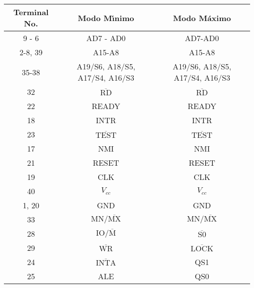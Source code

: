 \begin{table}[!htb]
\centering
\begin{tabular}{|c|c|c|} \hline
Terminal No. & Modo M\'{\i}nimo & Modo M\'aximo \\ \hline

9 - 6 & AD7 - AD0 & AD7-AD0 \\ \hline

2-8, 39 & A15-A8 & A15-A8 \\ \hline

35-38 & \parbox{3cm}{\vspace{3pt}A19/S6, A18/S5, A17/S4, A16/S3\vspace{3pt}} & %
\parbox{3cm}{\vspace{3pt}A19/S6, A18/S5, A17/S4, A16/S3\vspace{3pt}} \\ \hline

32 & $\overline{\mbox{RD}}$ & $\overline{\mbox{RD}}$ \\ \hline

22 & READY & READY \\ \hline

18 & INTR & INTR \\ \hline

23 & $\overline{\mbox{TEST}}$ & $\overline{\mbox{TEST}}$ \\ \hline

17 & NMI & NMI \\ \hline

21 & RESET & RESET \\ \hline

19 & CLK & CLK \\ \hline

40 & $V_{cc}$ & $V_{cc}$ \\ \hline

1, 20 & GND & GND \\ \hline

33 & $\mbox{MN}/\overline{\mbox{MX}}$ & $\mbox{MN}/\overline{\mbox{MX}}$ \\ %
\hline

28 & $\mbox{IO}/\overline{\mbox{M}}$ & $\overline{\mbox{S0}}$ \\ \hline

29 & $\overline{\mbox{WR}}$ & $\overline{\mbox{LOCK}}$ \\ \hline

24 & $\overline{\mbox{INTA}}$ & QS1 \\ \hline

25 & ALE & QS0 \\ \hline


\end{tabular}
\end{table}
